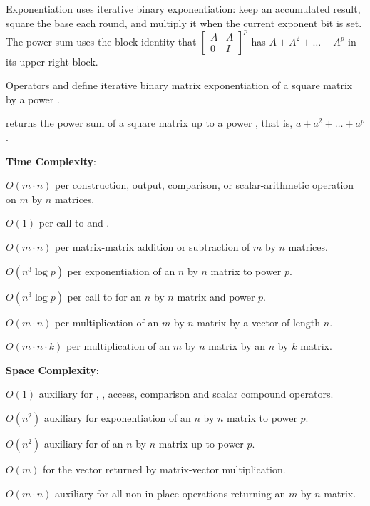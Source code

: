 Exponentiation uses iterative binary exponentiation: keep an accumulated result, square the base each round, and multiply it when the current exponent bit is set. The power sum uses the block identity that $\begin{bmatrix} A & A \\ 0 & I \end{bmatrix}^p$ has $A + A^2 + \dots + A^p$ in its upper-right block.

\begin{compactitem}
  \item Operators \inlinecode{\textasciicircum{}} and \inlinecode{\textasciicircum{}=} define iterative binary matrix exponentiation of a square matrix  by a  power .
  \item {} returns the power sum of a square matrix  up to a  power , that is, $a + a^2 + \ldots + a^p$.
\end{compactitem}

\textbf{Time Complexity}:
\begin{compactitem}
  \item $O(m \cdot n)$ per construction, output, comparison, or scalar-arithmetic operation on $m$ by $n$ matrices.
  \item $O(1)$ per call to  and .
  \item $O(m \cdot n)$ per matrix-matrix addition or subtraction of $m$ by $n$ matrices.
  \item $O(n^{3} \log p)$ per exponentiation of an $n$ by $n$ matrix to power $p$.
  \item $O(n^{3} \log p)$ per call to  for an $n$ by $n$ matrix and power $p$.
  \item $O(m \cdot n)$ per multiplication of an $m$ by $n$ matrix by a vector of length $n$.
  \item $O(m \cdot n \cdot k)$ per multiplication of an $m$ by $n$ matrix by an $n$ by $k$ matrix.
\end{compactitem}

\textbf{Space Complexity}:
\begin{compactitem}
  \item $O(1)$ auxiliary for , ,  access, comparison and scalar compound operators.
  \item $O(n^{2})$ auxiliary for exponentiation of an $n$ by $n$ matrix to power $p$.
  \item $O(n^{2})$ auxiliary for  of an $n$ by $n$ matrix up to power $p$.
  \item $O(m)$ for the vector returned by matrix-vector multiplication.
  \item $O(m \cdot n)$ auxiliary for all non-in-place operations returning an $m$ by $n$ matrix.
\end{compactitem}


